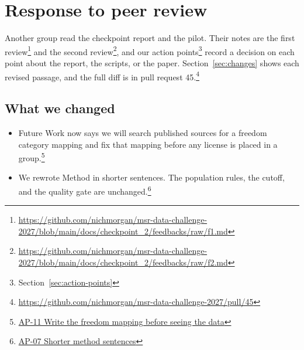 \section{Response to peer review}

Another group read the checkpoint report and the pilot.
Their notes are the first review\footnote{\url{https://github.com/nichmorgan/msr-data-challenge-2027/blob/main/docs/checkpoint_2/feedbacks/raw/f1.md}} and the second review\footnote{\url{https://github.com/nichmorgan/msr-data-challenge-2027/blob/main/docs/checkpoint_2/feedbacks/raw/f2.md}}, and our action points\footnote{Section~\ref{sec:action-points}} record a decision on each point about the report, the scripts, or the paper.
Section~\ref{sec:changes} shows each revised passage, and the full diff is in pull request 45.\footnote{\url{https://github.com/nichmorgan/msr-data-challenge-2027/pull/45}}

\subsection*{What we changed}

\begin{itemize}
  \item Future Work now says we will search published sources for a freedom category mapping and fix that mapping before any license is placed in a group.\footnote{\hyperref[ap:11]{AP-11 Write the freedom mapping before seeing the data}}
  \item We rewrote Method in shorter sentences. The population rules, the cutoff, and the quality gate are unchanged.\footnote{\hyperref[ap:07]{AP-07 Shorter method sentences}}
\end{itemize}
